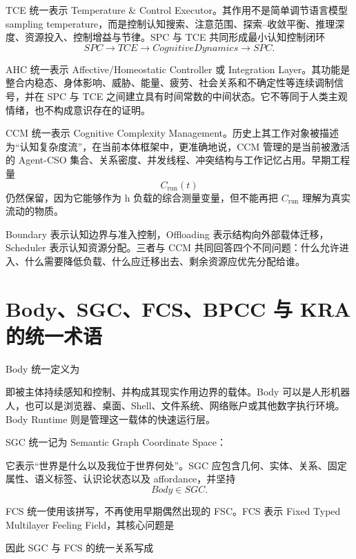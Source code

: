 TCE 统一表示 Temperature \& Control Executor。其作用不是简单调节语言模型 sampling temperature，而是控制认知搜索、注意范围、探索--收敛平衡、推理深度、资源投入、控制增益与节律。SPC 与 TCE 共同形成最小认知控制闭环
\[
SPC
\rightarrow
TCE
\rightarrow
CognitiveDynamics
\rightarrow
SPC.
\]

AHC 统一表示 Affective/Homeostatic Controller 或 Integration Layer。其功能是整合内稳态、身体影响、威胁、能量、疲劳、社会关系和不确定性等连续调制信号，并在 SPC 与 TCE 之间建立具有时间常数的中间状态。它不等同于人类主观情绪，也不构成意识存在的证明。

CCM 统一表示 Cognitive Complexity Management。历史上其工作对象被描述为“认知复杂度流”，在当前本体框架中，更准确地说，CCM 管理的是当前被激活的 Agent-CSO 集合、关系密度、并发线程、冲突结构与工作记忆占用。早期工程量
\[
C_{\mathrm{run}}(t)
\]
仍然保留，因为它能够作为 h 负载的综合测量变量，但不能再把 $C_{\mathrm{run}}$ 理解为真实流动的物质。

Boundary 表示认知边界与准入控制，Offloading 表示结构向外部载体迁移，Scheduler 表示认知资源分配。三者与 CCM 共同回答四个不同问题：什么允许进入、什么需要降低负载、什么应迁移出去、剩余资源应优先分配给谁。

\section{Body、SGC、FCS、BPCC 与 KRA 的统一术语}

Body 统一定义为
\begin{statementbox}
\centering
{}
\end{statementbox}
即被主体持续感知和控制、并构成其现实作用边界的载体。Body 可以是人形机器人，也可以是浏览器、桌面、Shell、文件系统、网络账户或其他数字执行环境。Body Runtime 则是管理这一载体的快速运行层。

SGC 统一记为 Semantic Graph Coordinate Space：
\begin{statementbox}
\centering
{}
\end{statementbox}
它表示“世界是什么以及我位于世界何处”。SGC 应包含几何、实体、关系、固定属性、语义标签、认识论状态以及 affordance，并坚持
\[
Body\in SGC.
\]

FCS 统一使用该拼写，不再使用早期偶然出现的 FSC。FCS 表示 Fixed Typed Multilayer Feeling Field，其核心问题是
\begin{statementbox}
\centering
{}
\end{statementbox}
因此 SGC 与 FCS 的统一关系写成
\begin{statementbox}
\centering
{}
\end{statementbox}


